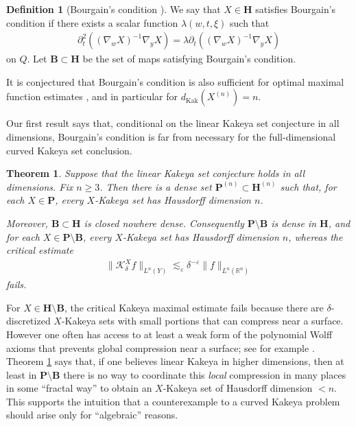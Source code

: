\documentclass[reqno,11pt]{amsart}
\numberwithin{equation}{section}
\numberwithin{figure}{section}
\def\R{\mathbb{R}}
\def\eps{\varepsilon}
\renewcommand\geq{\geqslant}
\theoremstyle{plain}
\newtheorem{theorem}[thm]{Theorem}
\theoremstyle{definition}
\newtheorem{definition}[thm]{Definition}
\newcommand{\Kak}{\mathrm{Kak}}
\begin{document}
    \begin{definition}[Bourgain's condition ]
        We say that $X \in \mathbf H$ satisfies Bourgain's condition if there exists a scalar function $\lambda(w,t,\xi)$ such that 
        \begin{align}
            \partial_t^2((\nabla_w X)^{-1} \nabla_y X) = \lambda \partial_t ((\nabla_w X)^{-1} \nabla_y X) 
        \end{align}
        on $Q$.
        Let $\mathbf B \subset \mathbf H$ be the set of maps satisfying Bourgain's condition. 
    \end{definition}
    It is conjectured that Bourgain's condition is also sufficient for optimal maximal function estimates \cite{Nadjimzadah2026Bourgain, hormanderDichotomy}, and in particular for $d_{\Kak}(X^{(n)})=n$.

    
    Our first result says that, conditional on the linear Kakeya set conjecture in all dimensions, Bourgain's condition is far from necessary for the full-dimensional curved Kakeya set conclusion. 

    
    \begin{theorem}\label{thm: density}
            Suppose that the linear Kakeya set conjecture holds in all dimensions. Fix $n \geq 3$. Then there is a dense set $\mathbf P^{(n)} \subset \mathbf H^{(n)}$ such that, for each $X \in \mathbf P$, every $X$-Kakeya set has Hausdorff dimension $n$. 

            Moreover, $\mathbf B \subset 
            \mathbf H$ is closed nowhere dense. Consequently $\mathbf P \setminus \mathbf B$ is dense in $\mathbf H$, and for each $X \in \mathbf P \setminus \mathbf B$, every $X$-Kakeya set has Hausdorff dimension $n$, whereas the critical estimate 
            \begin{align}
                \|\mathcal K_\delta^{X} f\|_{L^n(Y)} \lesssim_\eps \delta^{-\eps} \| f\|_{L^n(\R^n)}
            \end{align}
            fails.
    \end{theorem}
    For $X \in \mathbf H \setminus \mathbf B$, the critical Kakeya maximal estimate fails because there are $\delta$-discretized $X$-Kakeya sets with small portions that can compress near a surface. However one often has access to at least a weak form of the polynomial Wolff axioms that prevents global compression near a surface; see for example \cite{guo2026curvedkakeyaproblemsprojective, beyondUniversal}.
    Theorem \ref{thm: density} says that, if one believes linear Kakeya in higher dimensions, then at least in $\mathbf P \setminus \mathbf B$ there is no way to coordinate this \emph{local} compression
    in many places in some ``fractal way'' to obtain an $X$-Kakeya set of Hausdorff dimension $< n$. This supports the intuition that a counterexample to a curved Kakeya problem should arise only for ``algebraic'' reasons.
\end{document}
